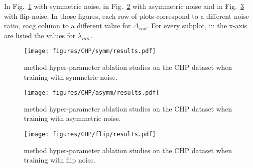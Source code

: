 \documentclass{llncs}
\begin{document}
In Fig.~\ref{fig:CHP_symm} with symmetric noise, in Fig.~\ref{fig:CHP_asymm} with asymmetric noise and in Fig.~\ref{fig:CHP_flip} with flip noise.
In those figures, each row of plots correspond to a different noise ratio, eacg column to a different value for $\Delta_{end}$.
For every subplot, in the x-axis are listed the values for $\lambda_{init}$.

\begin{figure}[th!]
    \centering
    \texttt{[image: figures/CHP/symm/results.pdf]}
    \caption{\acrshort{method} hyper-parameter ablation studies on the CHP dataset when training with symmetric noise.}
    \label{fig:CHP_symm}
\end{figure}

\begin{figure}[th!]
    \centering
    \texttt{[image: figures/CHP/asymm/results.pdf]}
    \caption{\acrshort{method} hyper-parameter ablation studies on the CHP dataset when training with asymmetric noise.}
    \label{fig:CHP_asymm}
\end{figure}

\begin{figure}[th!]
    \centering
    \texttt{[image: figures/CHP/flip/results.pdf]}
    \caption{\acrshort{method} hyper-parameter ablation studies on the CHP dataset when training with flip noise.}
    \label{fig:CHP_flip}
\end{figure}



\clearpage


\end{document}
